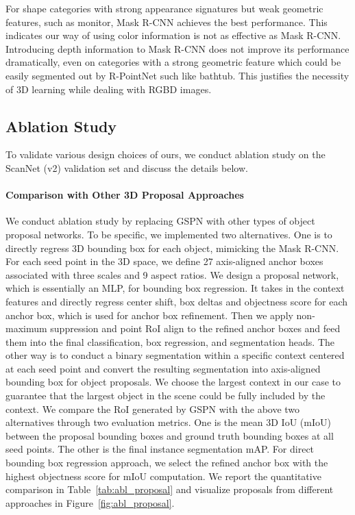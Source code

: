 \documentclass[10pt,twocolumn,letterpaper]{article}
\begin{document}
For shape categories with strong appearance signatures but weak geometric features, such as monitor, Mask R-CNN achieves the best performance. This indicates our way of using color information is not as effective as Mask R-CNN. Introducing depth information to Mask R-CNN does not improve its performance dramatically, even on categories with a strong geometric feature which could be easily segmented out by R-PointNet such like bathtub. This justifies the necessity of 3D learning while dealing with RGBD images.





\subsection{Ablation Study}
\label{sec:ablation_study}
To validate various design choices of ours, we conduct ablation study on the ScanNet (v2) validation set and discuss the details below.

\vspace{-\baselineskip}
\paragraph{Comparison with Other 3D Proposal Approaches}
We conduct ablation study by replacing GSPN with other types of object proposal networks. To be specific, we implemented two alternatives. One is to directly regress 3D bounding box for each object, mimicking the Mask R-CNN. For each seed point in the 3D space, we define 27 axis-aligned anchor boxes associated with three scales and 9 aspect ratios. We design a proposal network, which is essentially an MLP, for bounding box regression. It takes in the context features  and directly regress center shift, box deltas and objectness score for each anchor box, which is used for anchor box refinement. Then we apply non-maximum suppression and point RoI align to the refined anchor boxes and feed them into the final classification, box regression, and segmentation heads. The other way is to conduct a binary segmentation within a specific context centered at each seed point and convert the resulting segmentation into axis-aligned bounding box for object proposals. We choose the largest context  in our case to guarantee that the largest object in the scene could be fully included by the context. We compare the RoI generated by GSPN with the above two alternatives through two evaluation metrics. One is the mean 3D IoU (mIoU) between the proposal bounding boxes and ground truth bounding boxes at all seed points. The other is the final instance segmentation mAP. For direct bounding box regression approach, we select the refined anchor box with the highest objectness score for mIoU computation. We report the quantitative comparison in Table~\ref{tab:abl_proposal} and visualize proposals from different approaches in Figure~\ref{fig:abl_proposal}.
\end{document}
